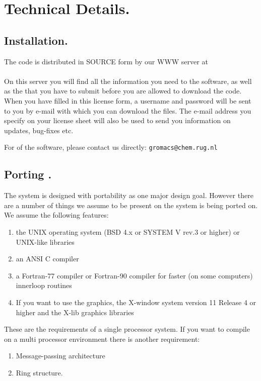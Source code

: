\chapter{Technical Details.}
\label{ch:install}
\section{Installation.}
The {\gromacs} code is distributed in SOURCE form by our WWW server at\\
{\wwwpage}\\
On this server you will find all the information you need to 
the software, as well as the  that you have to submit
before you are allowed to download the code. When you have filled in this
license form, a username and password will be sent to you by e-mail
with which you can download the files. The e-mail address you specify
on your license sheet will also be used to send you information on
updates, bug-fixes etc.

For  of the software, please contact us directly:
{\tt gromacs@chem.rug.nl}

\section{Porting {\gromacs}.}
The {\gromacs} system is designed with portability as one major design
goal. However there are a number of things we assume to be present on
the system {\gromacs} is being ported on. We assume the following
features:

\begin{enumerate}
\item 	the UNIX operating system (BSD 4.x or SYSTEM V rev.3 or higher) 
	or UNIX-like libraries
\item 	an ANSI C compiler 
\item	a Fortran-77 compiler or Fortran-90 compiler
	for faster (on some computers) innerloop routines
\item 	If you want to use the graphics, the X-window system version 
	11 Release 4 or higher and the X-lib graphics libraries
\end{enumerate}

These are the requirements of a single processor system. If you want
to compile {\gromacs} on a multi processor environment there is another
requirement:

\begin{enumerate}
\item Message-passing architecture
\item Ring structure.
\end{enumerate}

